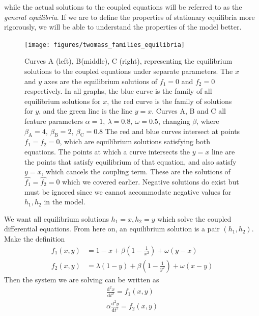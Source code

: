 \documentclass{report}
\begin{document}
while the actual solutions to the coupled equations will be referred to as the \textit{general equilibria}.
If we are to define the properties of stationary equilibria more rigorously,
we will be able to understand the properties of the model better.
\begin{figure}
    \centering
    \texttt{[image: figures/twomass\_families\_equilibria]}
    \caption{
        Curves A (left), B(middle), C (right), representing the equilibrium solutions to the coupled equations under separate parameters.
        The $x$ and $y$ axes are the equilibrium solutions of $f_1 = 0$ and $f_2=0$ respectively. 
        In all graphs, the blue curve is the family of all equilibrium solutions for $x$,
        the red curve is the family of solutions for $y$,
        and the green line is the line $y=x$.
        Curves A, B and C all feature parameters \(\alpha = 1,~\lambda=0.8,~\omega = 0.5\), changing $\beta$,
        where \(\beta_\mathrm{A} = 4,~\beta_\mathrm{B} = 2,~\beta_\mathrm{C} = 0.8\)
        The red and blue curves intersect at points $f_1=f_2=0$,
        which are equilibrium solutions satisfying both equations.
        The points at which a curve intersects the $y=x$ line are the points that satisfy equilibrium of that equation, and also satisfy $y=x$,
        which cancels the coupling term.
        These are the solutions of $\hat{f_1}=\hat{f_2}=0$ which we covered earlier.
        Negative solutions do exist but must be ignored since we cannot accommodate negative values for $h_1, h_2$ in the model.
    }
    \label{fig:twomass_equilibrium_curves}
\end{figure}
We want all equilibrium solutions \(h_1 = x, h_2 = y\) which solve the coupled differential equations.
From here on, an equilibrium solution is a pair \((h_1,h_2)\).
Make the definition
\begin{equation}
    \begin{aligned}
        f_1(x,y) &= 1-x + \beta\left(1 - \frac{1}{x^2}\right) + \omega(y-x) \\
        f_2(x,y) &= \lambda(1-y) + \beta\left(1 - \frac{1}{y^2}\right) + \omega(x-y)
        \label{eqn:twomass_equilibrium_functions}
    \end{aligned}
\end{equation}
Then the system we are solving can be written as
\begin{equation}
    \begin{aligned}
        \frac{\mathrm{d}^2x}{\mathrm{d}t^2} = f_1(x,y) \\
        \alpha\frac{\mathrm{d}^2y}{\mathrm{d}t^2} = f_2(x,y)
        \label{eqn:twomass_slave}  
    \end{aligned}
\end{equation}
\end{document}
